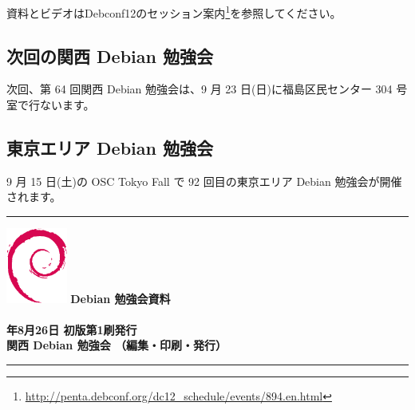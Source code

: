 \documentclass[mingoth,a4paper]{jsarticle}
\newcommand{\debmtgyear}{2012}
\newcommand{\debmtgdate}{26}
\newcommand{\debmtgmonth}{8}
\begin{document}
資料とビデオはDebconf12のセッション案内\footnote{\url{http://penta.debconf.org/dc12_schedule/events/894.en.html}}を参照してください。

\clearpage


\subsection{次回の関西 Debian 勉強会}

次回、第 64 回関西 Debian 勉強会は、9 月 23 日(日)に福島区民センター 304 号室で行ないます。

\subsection{東京エリア Debian 勉強会}
9 月 15 日(土)の OSC Tokyo Fall で 92 回目の東京エリア Debian 勉強会が開催されます。



\printindex
 \cleartooddpage

 \begin{minipage}[b]{0.2\hsize}
 \end{minipage}
 \begin{minipage}[b]{0.8\hsize}

 \vspace*{15cm}
 \rule{\hsize}{1mm}
 \vspace{2mm}
 \includegraphics[width=2cm]{image200502/openlogo-nd.eps}
 \noindent \Large \bf Debian 勉強会資料\\ \\
 \noindent \normalfont \debmtgyear{}年\debmtgmonth{}月\debmtgdate{}日 \hspace{5mm}  初版第1刷発行\\
 \noindent \normalfont 関西 Debian 勉強会 （編集・印刷・発行）\\
 \rule{\hsize}{1mm}
 \end{minipage}
\end{document}
